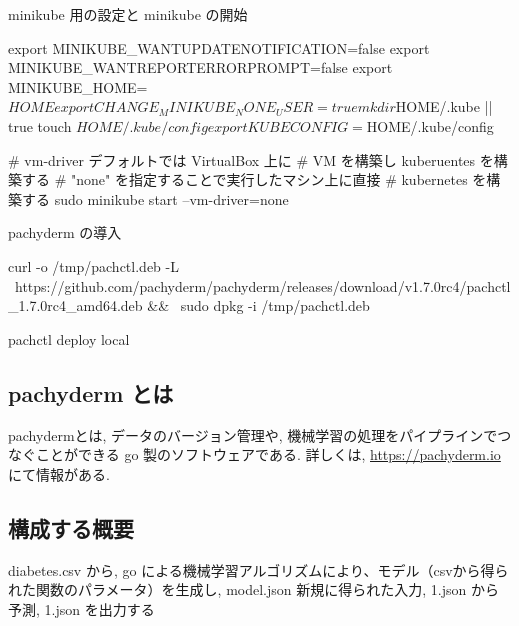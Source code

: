 \documentclass[mingoth,a4paper]{jsarticle}
\begin{document}
minikube 用の設定と minikube の開始
\begin{commandline}
export MINIKUBE_WANTUPDATENOTIFICATION=false
export MINIKUBE_WANTREPORTERRORPROMPT=false
export MINIKUBE_HOME=$HOME
export CHANGE_MINIKUBE_NONE_USER=true
mkdir $HOME/.kube || true
touch $HOME/.kube/config

export KUBECONFIG=$HOME/.kube/config

# vm-driver デフォルトでは VirtualBox 上に
# VM を構築し kuberuentes を構築する
# "none" を指定することで実行したマシン上に直接
# kubernetes を構築する
sudo minikube start --vm-driver=none

\end{commandline}

pachyderm の導入
\begin{commandline}
curl -o /tmp/pachctl.deb -L \
https://github.com/pachyderm/pachyderm/releases/download/v1.7.0rc4/pachctl_1.7.0rc4_amd64.deb && \
sudo dpkg -i /tmp/pachctl.deb

pachctl deploy local
\end{commandline}

\subsection{pachyderm とは}
pachydermとは, データのバージョン管理や, 機械学習の処理をパイプラインでつなぐことができる go 製のソフトウェアである.
詳しくは, \url{https://pachyderm.io} にて情報がある.

\subsection{構成する概要}

diabetes.csv から, go による機械学習アルゴリズムにより、モデル（csvから得られた関数のパラメータ）を生成し, model.json
新規に得られた入力, 1.json から予測, 1.json を出力する
\end{document}

